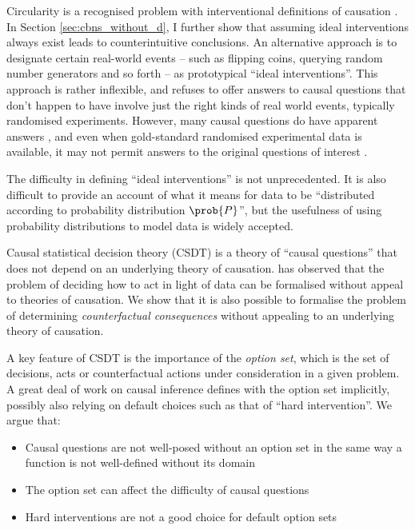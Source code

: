 Circularity is a recognised problem with interventional definitions of causation \citep{woodward_causation_2016}. In Section \ref{sec:cbns_without_d}, I further show that assuming ideal interventions always exist leads to counterintuitive conclusions. An alternative approach is to designate certain real-world events -- such as flipping coins, querying random number generators and so forth -- as prototypical ``ideal interventions''. This approach is rather inflexible, and refuses to offer answers to causal questions that don't happen to have involve just the right kinds of real world events, typically randomised experiments. However, many causal questions do have apparent answers \citep{pearl_challenging_2018}, and even when gold-standard randomised experimental data is available, it may not permit answers to the original questions of interest \citep{deaton_understanding_2018,heckman_randomization_1991}.

The difficulty in defining ``ideal interventions'' is not unprecedented. It is also difficult to provide an account of what it means for data to be ``distributed according to probability distribution $\prob{P}$''\citep{hajek_interpretations_2019}, but the usefulness of using probability distributions to model data is widely accepted.

Causal statistical decision theory (CSDT) is a theory of ``causal questions'' that does not depend on an underlying theory of causation. \citet{dawid_decision-theoretic_2020} has observed that the problem of deciding how to act in light of data can be formalised without appeal to theories of causation. We show that it is also possible to formalise the problem of determining \emph{counterfactual consequences} without appealing to an underlying theory of causation.

A key feature of CSDT is the importance of the \emph{option set}, which is the set of decisions, acts or counterfactual actions under consideration in a given problem. A great deal of work on causal inference defines with the option set implicitly, possibly also relying on default choices such as that of ``hard intervention''. We argue that:

\begin{itemize}
    \item Causal questions are not well-posed without an option set in the same way a function is not well-defined without its domain
    \item The option set can affect the difficulty of causal questions
    \item Hard interventions are not a good choice for default option sets
\end{itemize}